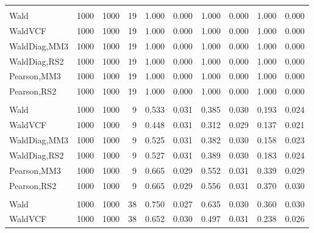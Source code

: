 \documentclass[
]{article}
\begin{document}
\begin{table}[H]
{\begin{tabular}[t]{lrrrrrrlrr}
\addlinespace[0.3em]
\multicolumn{10}{l}{\textbf{1F 15V}}\\
\hspace{1em}Wald & 1000 & 1000 & 19 & 1.000 & 0.000 & 1.000 & 0.000 & 1.000 & 0.000\\
\hspace{1em}WaldVCF & 1000 & 1000 & 19 & 1.000 & 0.000 & 1.000 & 0.000 & 1.000 & 0.000\\
\hspace{1em}WaldDiag,MM3 & 1000 & 1000 & 19 & 1.000 & 0.000 & 1.000 & 0.000 & 1.000 & 0.000\\
\hspace{1em}WaldDiag,RS2 & 1000 & 1000 & 19 & 1.000 & 0.000 & 1.000 & 0.000 & 1.000 & 0.000\\
\hspace{1em}Pearson,MM3 & 1000 & 1000 & 19 & 1.000 & 0.000 & 1.000 & 0.000 & 1.000 & 0.000\\
\hspace{1em}Pearson,RS2 & 1000 & 1000 & 19 & 1.000 & 0.000 & 1.000 & 0.000 & 1.000 & 0.000\\
\addlinespace[0.3em]
\multicolumn{10}{l}{\textbf{2F 10V}}\\
\hspace{1em}Wald & 1000 & 1000 & 9 & 0.533 & 0.031 & 0.385 & 0.030 & 0.193 & 0.024\\
\hspace{1em}WaldVCF & 1000 & 1000 & 9 & 0.448 & 0.031 & 0.312 & 0.029 & 0.137 & 0.021\\
\hspace{1em}WaldDiag,MM3 & 1000 & 1000 & 9 & 0.525 & 0.031 & 0.382 & 0.030 & 0.158 & 0.023\\
\hspace{1em}WaldDiag,RS2 & 1000 & 1000 & 9 & 0.527 & 0.031 & 0.389 & 0.030 & 0.183 & 0.024\\
\hspace{1em}Pearson,MM3 & 1000 & 1000 & 9 & 0.665 & 0.029 & 0.552 & 0.031 & 0.339 & 0.029\\
\hspace{1em}Pearson,RS2 & 1000 & 1000 & 9 & 0.665 & 0.029 & 0.556 & 0.031 & 0.370 & 0.030\\
\addlinespace[0.3em]
\multicolumn{10}{l}{\textbf{3F 15V}}\\
\hspace{1em}Wald & 1000 & 1000 & 38 & 0.750 & 0.027 & 0.635 & 0.030 & 0.360 & 0.030\\
\hspace{1em}WaldVCF & 1000 & 1000 & 38 & 0.652 & 0.030 & 0.497 & 0.031 & 0.238 & 0.026\\

\end{tabular}}
\end{table}
\end{document}
